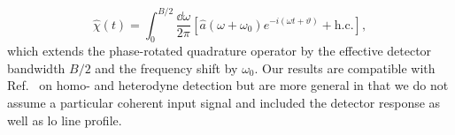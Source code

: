 \begin{equation}
	\hat\chi(t)
	=
	\int_0^{B/2}\frac{\dd{\omega}}{2\pi}
	\left[
		\hat{a}(\omega+\omega_0)
		e^{-i(\omega t+\vartheta)}
		+
		\text{h.c.}
	\right]
	,
\end{equation}
which extends the phase-rotated quadrature operator by the effective detector bandwidth $B/2$ and the frequency shift by $\omega_0$.
Our results are compatible with Ref.~\cite{Gardiner2000,Shapiro2009,Loudon2000,Vogel2006,Kikuchi2016} on homo- and heterodyne detection but are more general in that we do not assume a particular coherent input signal and included the detector response as well as \gls{lo} line profile.